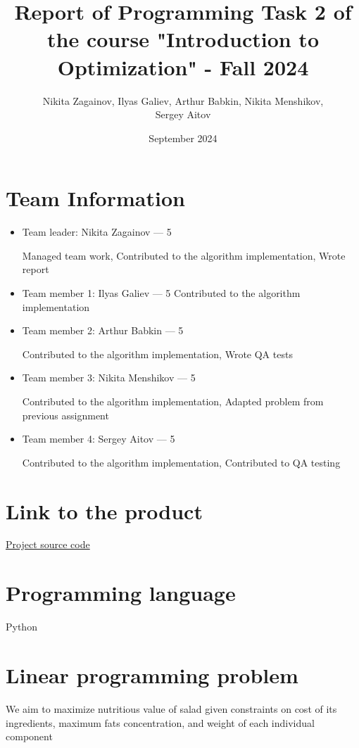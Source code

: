 \documentclass{article}
\title{Report of Programming Task 2 of the course "Introduction to Optimization" - Fall 2024}
\author{Nikita Zagainov, Ilyas Galiev, Arthur Babkin, Nikita Menshikov, \\ Sergey Aitov}
\date{September 2024}
\begin{document}
\maketitle

\section{Team Information}
\noindent
\begin{itemize}
    \item Team leader: Nikita Zagainov --- 5

          Managed team work, Contributed to the algorithm implementation, Wrote report

    \item Team member 1: Ilyas Galiev --- 5 Contributed to the algorithm implementation

    \item Team member 2: Arthur Babkin --- 5

          Contributed to the algorithm implementation, Wrote QA tests
    \item Team member 3: Nikita Menshikov --- 5

          Contributed to the algorithm implementation, Adapted problem from previous
          assignment

    \item Team member 4: Sergey Aitov --- 5

          Contributed to the algorithm implementation, Contributed to QA testing
\end{itemize}
\section{Link to the product}
\href{https://github.com/V1adych/interior-point}{Project source code}

\section{Programming language}
Python

\section{Linear programming problem}
We aim to maximize nutritious value of salad given constraints on cost of its
ingredients, maximum fats concentration, and weight of each individual
component
\end{document}

